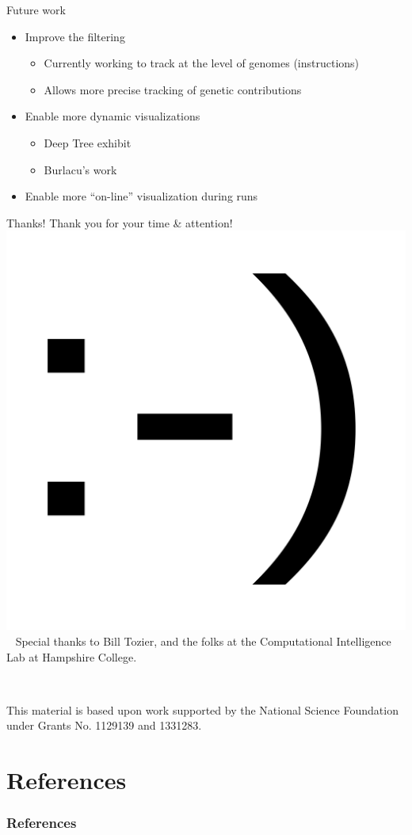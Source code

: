 \documentclass{beamer}
\begin{document}
\begin{frame}{Future work}
\begin{itemize}
	\item Improve the filtering
    \begin{itemize}
    	\item Currently working to track at the level of genomes (instructions)
        \item Allows more precise tracking of genetic contributions
    \end{itemize}
	\item Enable more dynamic visualizations 
    \begin{itemize}
    	\item Deep Tree exhibit~\cite{block2012deeptree}
        \item Burlacu's work~\cite{Burlacu:CIEES:2015}
    \end{itemize}
    \item Enable more ``on-line'' visualization during runs
\end{itemize}
\end{frame}

\begin{frame}{Thanks!}
\center \Large
Thank you for your time \& attention! \\ \medskip
\includegraphics[width=.1\textwidth]{Illustrations/smile.png} \\ \medskip
\normalsize
~
Special thanks to Bill Tozier, and the folks at the Computational Intelligence Lab at Hampshire College.

~

This material is based upon work supported by the National Science Foundation under 
Grants No. 1129139 and 1331283.

\end{frame}


\section*{References}

\begin{frame}[allowframebreaks]
\frametitle{References}


\end{frame}
\end{document}
